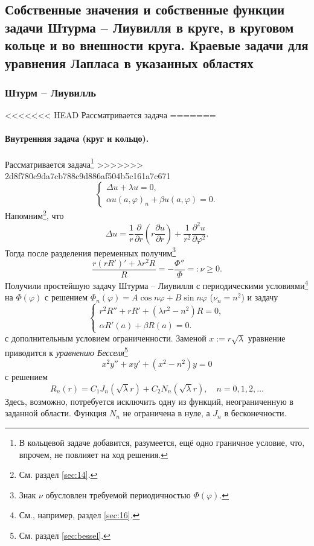 \subsection{Собственные значения и собственные функции задачи Штурма -- Лиувилля
в круге, в круговом кольце и во внешности круга. Краевые задачи для уравнения
Лапласа в указанных областях}\label{sec:20}
\subsubsection{Штурм -- Лиувилль}
<<<<<<< HEAD
Рассматривается задача
=======
\paragraph{Внутренняя задача (круг и кольцо).}
Рассматривается задача\footnote{В кольцевой задаче добавится, разумеется, ещё
одно граничное условие, что, впрочем, не повлияет на ход решения.}
>>>>>>> 2d8f780c9da7cb788c9d886af504b5c161a7c671
\[
  \begin{cases}
    \Delta u + \lambda u = 0,\\
    \alpha u(a, \varphi)_n + \beta u(a, \varphi) = 0.
  \end{cases}
\]
Напомним\footnote{См. раздел \ref{sec:14}.}, что  
\[
    \Delta u = \frac{1}{r} \frac{\partial}{\partial r} \left( r \frac{\partial
    u}{\partial r} \right) + \frac{1}{r^2} \frac{\partial^2 u}{\partial
  \varphi^2}.
\]
Тогда после разделения переменных получим\footnote{Знак $ \nu $ обусловлен
требуемой периодичностью $ \Phi(\varphi) $.}
\[
    \frac{r (r R')' + \lambda r^2 R}{R} = - \frac{\Phi''}{\Phi} =: \nu \geqslant
    0.
\]
Получили простейшую задачу Штурма -- Лиувилля с периодическими
условиями\footnote{См., например, раздел \ref{sec:16}.}
на $ \Phi(\varphi) $ с решением $ \Phi_n(\varphi) = A\cos n\varphi + B\sin
n\varphi $ ($ \nu_n = n^2 $) и задачу
\[
  \begin{cases}
    r^2R'' + rR' + (\lambda r^2 - n^2) R = 0,\\
    \alpha R'(a) + \beta R(a) = 0.
  \end{cases}
\]
с дополнительным условием ограниченности. Заменой $ x := r\sqrt\lambda $
уравнение
приводится к \emph{уравнению Бесселя}\footnote{См. раздел \ref{sec:bessel}.} 
\[
    x^2y'' + xy' + (x^2 - n^2) y = 0
\]
с решением  
\[
    R_n(r) = C_1 J_n(\sqrt \lambda r) + C_2 N_n (\sqrt\lambda r), \quad n = 0,
    1, 2, \ldots
\]
Здесь, возможно, потребуется исключить одну из функций, неограниченную в
заданной области. Функция $ N_n $ не ограничена в нуле, а $ J_n $ в бесконечности.
